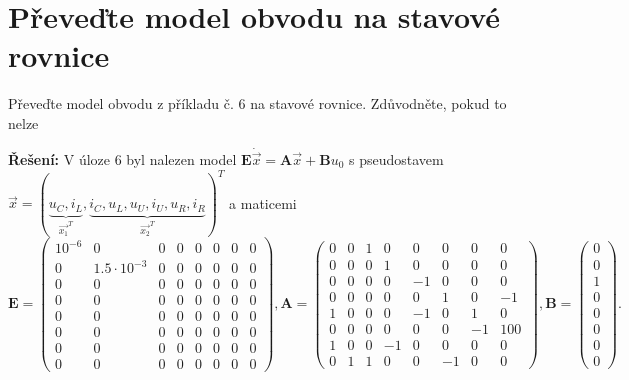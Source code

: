 \documentclass[twoside]{article}
\begin{document}
\section{Převeďte model obvodu na stavové rovnice}
Převeďte model obvodu z příkladu č. 6 na stavové rovnice. Zdůvodněte, pokud to nelze

\textbf{Řešení:}
V úloze 6 byl nalezen model $\mathbf{E} \dot{\vec{x}} = \mathbf{A} \vec{x} + \mathbf{B} u_0$ s pseudostavem 
$\vec{x} = (\underbrace{u_C, i_L}_{\vec{x_1}^T}, \underbrace{i_C, u_L, u_U, i_U, u_R, i_R}_{\vec{x_2}^T})^T$ a maticemi
\begin{equation}
	\mathbf{E} = \left(\begin{array}{cc|cccccc}
		10^{-6} &        0          &  0      &   0      &   0      &   0      &   0       &  0 \\
		0       &1.5 \cdot 10^{-3}  &       0 &        0 &        0 &        0 &        0  &       0 \\
		\hline
		0       &               0   &      0  &       0  &       0  &       0  &       0   &      0 \\
		0       &               0   &      0  &       0  &       0  &       0  &       0   &      0 \\
		0       &               0   &      0  &       0  &       0  &       0  &       0   &      0 \\
		0       &               0   &      0  &       0  &       0  &       0  &       0   &      0 \\
		0       &               0   &      0  &       0  &       0  &       0  &       0   &      0 \\
		0       &               0   &      0  &       0  &       0  &       0  &       0   &      0 
	\end{array}\right), \mathbf{A} = \left( \begin{array}{cc|cccccc}
		
		0     & 0  &   1&     0  &   0 &    0 &    0 &    0 \\
		0     & 0  &   0&     1  &   0 &    0 &    0 &    0 \\
		\hline
		0     & 0  &   0&     0  &  -1 &    0 &    0 &    0 \\
		0     & 0  &   0&     0  &   0 &    1 &    0 &   -1 \\
		1     & 0  &   0&     0  &  -1 &    0 &    1 &    0 \\
		0     & 0  &   0&     0  &   0 &    0 &   -1 &  100 \\
		1     & 0  &   0&    -1  &   0 &    0 &    0 &    0 \\
		0     & 1  &   1&     0  &   0 &   -1 &    0 &    0
	\end{array}\right),\mathbf{B} = \left(\begin{array} {c}
		0 \\
		0 \\
		\hline
		1 \\
		0 \\
		0 \\
		0 \\
		0 \\
		0
	\end{array}\right).	
\end{equation}
\end{document}
